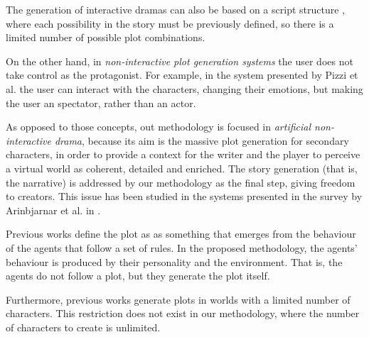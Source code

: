 \documentclass{sig-alternate}
\begin{document}
The generation of interactive dramas can also be based on a script
structure \cite{ArchitectureYoung04}, where each possibility in the
story must be previously defined, so there is a limited number of
possible plot combinations.

On the other hand, in {\em non-interactive plot generation systems} the user
does not take control as the protagonist. For example, in the system
presented by Pizzi et al. \cite{pizzi2007interactive} the user can
interact with the characters, changing their emotions, but making the
user an spectator, rather than an actor. %


As opposed to those concepts, out methodology is focused in {\em artificial non-interactive drama}, 
because its aim is the massive plot generation
for secondary characters, in order to provide a context for the writer and the
player to perceive a virtual world as coherent, detailed and
enriched. The story generation (that is, the narrative) is addressed 
by our methodology as the final step, giving freedom to creators. This issue has been studied in the systems presented in
the survey by Arinbjarnar et al. in \cite{ReviewArinbjarnar09}. %


Previous works define the plot as as something that emerges from the behaviour of the agents that follow a set of rules. In the proposed methodology, the agents' behaviour is produced by their personality and the environment. That is, the agents do not follow a plot, but they generate the plot itself.


Furthermore,  previous works generate plots in worlds with a limited number of characters. This restriction does not exist in our methodology, where the number of characters to create is unlimited. 
\end{document}
